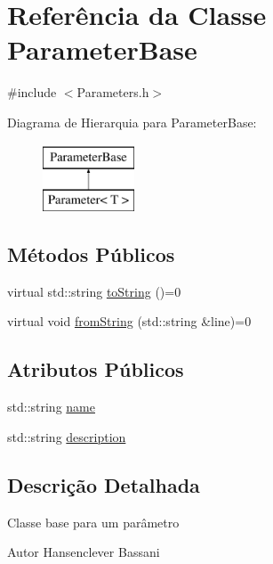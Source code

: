 \hypertarget{class_parameter_base}{\section{Referência da Classe Parameter\-Base}
\label{class_parameter_base}
}


{\ttfamily \#include $<$Parameters.\-h$>$}

Diagrama de Hierarquia para Parameter\-Base\-:\begin{figure}[H]
\begin{center}
\leavevmode
\includegraphics[height=2.000000cm]{class_parameter_base}
\end{center}
\end{figure}
\subsection*{Métodos Públicos}
\begin{DoxyCompactItemize}
\item 
virtual std\-::string \hyperlink{class_parameter_base_a98af4bed3a47e680e51b6219b744e68b}{to\-String} ()=0
\item 
virtual void \hyperlink{class_parameter_base_a949c6d70ed8893e577f492810f388073}{from\-String} (std\-::string \&line)=0
\end{DoxyCompactItemize}
\subsection*{Atributos Públicos}
\begin{DoxyCompactItemize}
\item 
std\-::string \hyperlink{class_parameter_base_a3e2e2ad34b89eabb0484b3a338133614}{name}
\item 
std\-::string \hyperlink{class_parameter_base_a6947177ee16a3821c8541635247188c5}{description}
\end{DoxyCompactItemize}


\subsection{Descrição Detalhada}
Classe base para um parâmetro \begin{DoxyAuthor}{Autor}
Hansenclever Bassani 
\end{DoxyAuthor}


